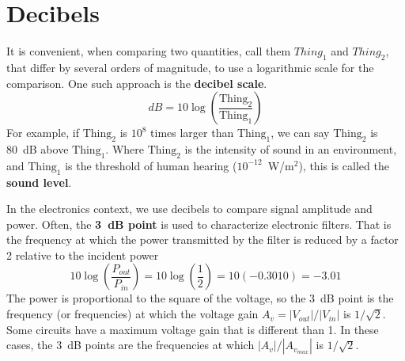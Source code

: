 \documentclass[11pt]{article}
\begin{document}
\section{Decibels}
\label{sec:dB}

It is convenient, when comparing two quantities, call them $Thing_1$ 
and $Thing_2$, that differ by several orders of magnitude, to use a
logarithmic scale for the comparison. One such approach is the
\textbf{decibel scale}.
\begin{equation}
  dB = 10 \log \left( \frac{\mathrm{Thing_2}}{\mathrm{Thing_1}} \right)
  \label{eq:db}
\end{equation}
For example, if $\mathrm{Thing_2}$ is $10^8$ times larger than
$\mathrm{Thing_1}$, we can say $\mathrm{Thing_2}$ is 80~dB above
$\mathrm{Thing_1}$. Where $\mathrm{Thing_2}$ is the intensity
of sound in an environment, and $\mathrm{Thing_1}$ is the threshold of
human hearing ($10^{-12}$~W/m$^2$), this is called the
\textbf{sound level}.

In the electronics context, we use decibels to compare signal
amplitude and power. Often, the \textbf{3~dB point} is used to characterize 
electronic filters. That is the frequency at which the power
transmitted by the filter is reduced by a factor 2 relative to the
incident power 
\[
10 \log \left( \frac{P_{out}}{P_{in}} \right)
= 10 \log \left( \frac{1}{2} \right) = 10 (-0.3010) = -3.01
\]
The power is proportional to the square of the voltage, so the 3~dB
point is the frequency (or frequencies) at which the voltage gain
$A_v = |V_{out}|/|V_{in}|$ is $1/\sqrt{2}$. Some circuits have a maximum
voltage gain that is different than 1. In these cases, the 3~dB
points are the frequencies at which $|A_v|/|A_{v_{max}}|$ is
$1/\sqrt{2}$. 



\end{document}

